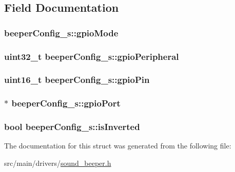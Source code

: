 \subsection{Field Documentation}
\hypertarget{structbeeperConfig__s_aa9d2793e40da3f3bb4c68fcd9be62f8a}{
\subsubsection[{gpio\+Mode}]{ beeper\+Config\+\_\+s\+::gpio\+Mode}}\label{structbeeperConfig__s_aa9d2793e40da3f3bb4c68fcd9be62f8a}
\hypertarget{structbeeperConfig__s_a7763aafc418b4ba02c2374623e178698}{
\subsubsection[{gpio\+Peripheral}]{\setlength{\rightskip}{0pt plus 5cm}uint32\+\_\+t beeper\+Config\+\_\+s\+::gpio\+Peripheral}}\label{structbeeperConfig__s_a7763aafc418b4ba02c2374623e178698}
\hypertarget{structbeeperConfig__s_a13035e9d77a8e465fc04fd8068b96368}{
\subsubsection[{gpio\+Pin}]{\setlength{\rightskip}{0pt plus 5cm}uint16\+\_\+t beeper\+Config\+\_\+s\+::gpio\+Pin}}\label{structbeeperConfig__s_a13035e9d77a8e465fc04fd8068b96368}
\hypertarget{structbeeperConfig__s_a01a3ee259d0c4953217c51f53b802872}{
\subsubsection[{gpio\+Port}]{$\ast$ beeper\+Config\+\_\+s\+::gpio\+Port}}\label{structbeeperConfig__s_a01a3ee259d0c4953217c51f53b802872}
\hypertarget{structbeeperConfig__s_aad323590652e0eb58a8ae0dc17a006f0}{
\subsubsection[{is\+Inverted}]{\setlength{\rightskip}{0pt plus 5cm}bool beeper\+Config\+\_\+s\+::is\+Inverted}}\label{structbeeperConfig__s_aad323590652e0eb58a8ae0dc17a006f0}


The documentation for this struct was generated from the following file\+:\begin{DoxyCompactItemize}
\item 
src/main/drivers/\hyperlink{sound__beeper_8h}{sound\+\_\+beeper.\+h}\end{DoxyCompactItemize}
